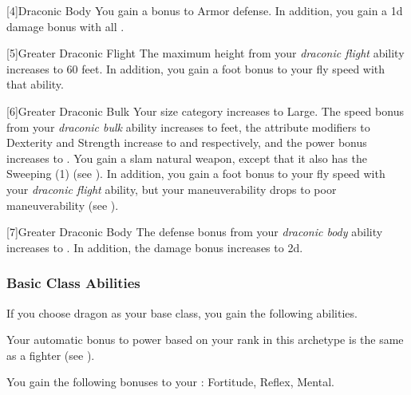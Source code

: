             [4]{Draconic Body} You gain a  bonus to Armor defense.
            In addition, you gain a \plus1d damage bonus with all .

            [5]{Greater Draconic Flight} The maximum height from your \textit{draconic flight} ability increases to 60 feet.
            In addition, you gain a  foot bonus to your fly speed with that ability.

            [6]{Greater Draconic Bulk} Your size category increases to Large.
            The speed bonus from your \textit{draconic bulk} ability increases to  feet, the attribute modifiers to Dexterity and Strength increase to  and  respectively, and the power bonus increases to .
            You gain a slam natural weapon, except that it also has the Sweeping (1)  (see ).
            In addition, you gain a  foot bonus to your fly speed with your \textit{draconic flight} ability, but your maneuverability drops to poor maneuverability (see ).

            [7]{Greater Draconic Body} The defense bonus from your \textit{draconic body} ability increases to .
            In addition, the damage bonus increases to \plus2d.

        \subsubsection{Basic Class Abilities}
            If you choose dragon as your base class, you gain the following abilities.

             Your automatic bonus to power based on your rank in this archetype is the same as a fighter (see ).

            You gain the following bonuses to your :  Fortitude,  Reflex,  Mental.

